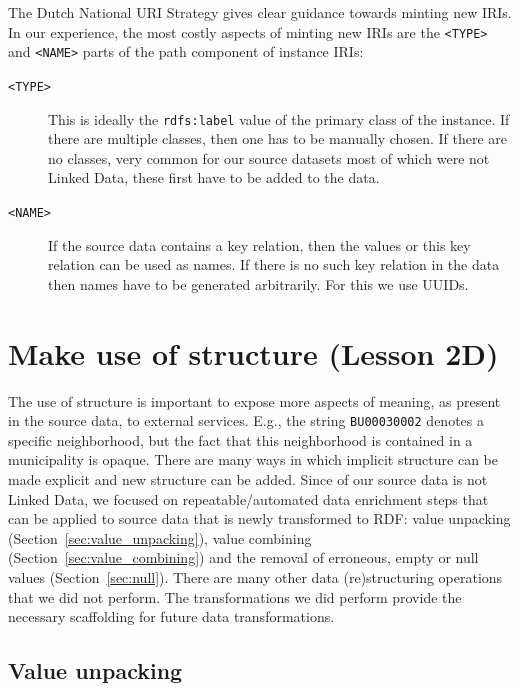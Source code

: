 \documentclass[a4paper]{scrartcl}
\newcommand{\textt}[1]{{\small \texttt{#1}}}
\begin{document}
The Dutch National URI Strategy gives clear guidance towards minting
new IRIs.  In our experience, the most costly aspects of minting new
IRIs are the \textt{<TYPE>} and \textt{<NAME>} parts of the path
component of instance IRIs:

\begin{description}
  
\item [\textt{<TYPE>}] This is ideally the \textt{rdfs:label} value of
  the primary class of the instance.  If there are multiple classes,
  then one has to be manually chosen.  If there are no classes, very
  common for our source datasets most of which were not Linked Data,
  these first have to be added to the data.

\item [\textt{<NAME>}] If the source data contains a key relation,
  then the values or this key relation can be used as names.  If there
  is no such key relation in the data then names have to be generated
  arbitrarily.  For this we use UUIDs.

\end{description}



\section{Make use of structure (Lesson 2D)}

The use of structure is important to expose more aspects of meaning,
as present in the source data, to external services.  E.g., the string
\textt{BU00030002} denotes a specific neighborhood, but the fact that
this neighborhood is contained in a municipality is opaque.  There are
many ways in which implicit structure can be made explicit and new
structure can be added.  Since of our source data is not Linked Data,
we focused on repeatable/automated data enrichment steps that can be
applied to source data that is newly transformed to RDF: value
unpacking (Section~\ref{sec:value_unpacking}), value combining
(Section~\ref{sec:value_combining}) and the removal of erroneous,
empty or null values (Section~\ref{sec:null}).  There are many other
data (re)structuring operations that we did not perform.  The
transformations we did perform provide the necessary scaffolding for
future data transformations.


\subsection{Value unpacking}
\label{sec:grammar}
\label{sec:value_unpacking}
\end{document}
